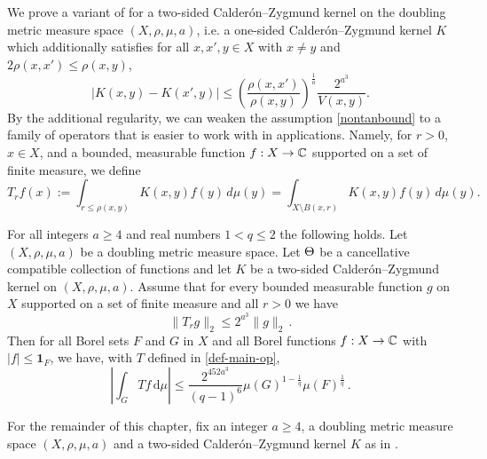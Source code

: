 We prove a variant of  for a two-sided Calder\'on--Zygmund kernel on the doubling metric measure space $(X,\rho,\mu,a)$, i.e. a one-sided Calder\'on--Zygmund kernel $K$ which additionally satisfies for all $x,x',y\in X$ with $x\neq y$ and $2\rho(x,x') \leq \rho(x,y)$,
\begin{equation}
    \label{eqkernel-x-smooth}
    |K(x,y) - K(x',y)| \leq \left(\frac{\rho(x,x')}{\rho(x,y)}\right)^{\frac{1}{a}}\frac{2^{a^3}}{V(x,y)}.
\end{equation}
By the additional regularity, we can weaken the assumption \eqref{nontanbound} to a family of operators that is easier to work with in applications.
Namely, for $r > 0$, $x\in X$, and a bounded, measurable function $f:X\to{\mathbb{C}}$ supported on a set of finite measure, we define
\begin{equation}
\label{def-T-r}
T_r f(x):= \int_{r\le\rho(x,y)} K(x,y) f(y) \, d\mu(y) = \int_{X\setminus B(x,r)} K(x,y) f(y) \, d\mu(y).
\end{equation}
\begin{theorem}
    \label{two-sided-metric-space-Carleson}
    \leanok
        For all  integers $a \ge  4$ and real numbers $1<q\le 2$
        the following holds.
        Let $(X,\rho,\mu,a)$ be a doubling metric measure space. Let  ${\Theta}$ be a
        cancellative compatible  collection of functions and let $K$ be a two-sided Calder\'on--Zygmund kernel on $(X,\rho,\mu,a)$. Assume  that for every bounded measurable function $g$ on $X$ supported on a set of finite measure and all $r>0$ we have
      \begin{equation}\label{two-sided-Hr-bound-assumption}
            \|T_r g\|_{2} \leq 2^{a^3} \|g\|_2\,.
        \end{equation}
        Then for all Borel sets $F$ and $G$ in $X$ and
        all Borel functions $f:X\to {\mathbb{C}}$ with
        $|f|\le \mathbf{1}_F$, we have, with $T$ defined in \eqref{def-main-op},
      \begin{equation}
        \label{two-sided-resweak}
            \left|\int_{G} T f \, \mathrm{d}\mu\right| \leq \frac{2^{452a^3}}{(q-1)^6} \mu(G)^{1-\frac{1}{q}} \mu(F)^{\frac{1}{q}}\, .
        \end{equation}
\end{theorem}

For the remainder of this chapter, fix an integer $a\ge 4$, a doubling metric measure space $(X,\rho,\mu,a)$ and a two-sided Calder\'on--Zygmund kernel $K$ as in .

